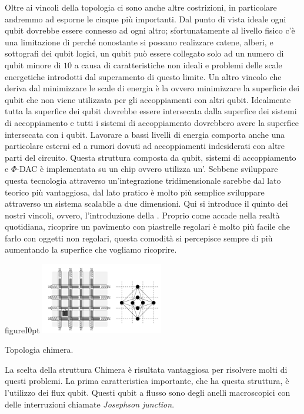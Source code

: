 Oltre ai vincoli della topologia ci sono anche altre costrizioni, in particolare andremmo ad esporne le cinque più importanti. Dal punto di vista ideale ogni qubit dovrebbe essere connesso ad ogni altro; sfortunatamente al livello fisico c'è una limitazione di  perché nonostante si possano realizzare catene, alberi, e sottografi dei qubit logici, un qubit può essere collegato solo ad un numero di qubit minore di $10$ a causa di caratteristiche non ideali e problemi delle scale energetiche introdotti dal superamento di questo limite. Un altro vincolo che deriva dal minimizzare le scale di energia è la  ovvero minimizzare la superficie dei qubit che non viene utilizzata per gli accoppiamenti con altri qubit. Idealmente tutta la superfice dei qubit dovrebbe essere intersecata dalla superfice dei sistemi di accoppiamento e tutti i sistemi di accoppiamento dovrebbero avere la superfice intersecata con i qubit. Lavorare a bassi livelli di energia comporta anche una particolare  esterni ed a rumori dovuti ad accoppiamenti indesiderati con altre parti del circuito. Questa struttura composta da qubit, sistemi di accoppiamento e $\Phi$-DAC è implementata su un chip ovvero utilizza un'. Sebbene sviluppare questa tecnologia attraverso un'integrazione tridimensionale sarebbe dal lato teorico più vantaggiosa, dal lato pratico è molto più semplice sviluppare attraverso un sistema scalabile a due dimensioni. Qui si introduce il quinto dei nostri vincoli, ovvero, l'introduzione della . Proprio come accade nella realtà quotidiana, ricoprire un pavimento con piastrelle regolari è molto più facile che farlo con oggetti non regolari, questa comodità si percepisce sempre di più aumentando la superfice che vogliamo ricoprire.

\begin{wrapfloat}{figure}{I}{0pt}
\includegraphics[width=0.4\textwidth]{Immagini/chimera.jpg}
\caption{Topologia chimera.}
\label{figura:chimera}
\end{wrapfloat}
\cite{ACI}La scelta della struttura Chimera è risultata vantaggiosa per risolvere molti di questi problemi. La prima caratteristica importante, che ha questa struttura, è l'utilizzo dei flux qubit. Questi qubit a flusso sono degli anelli macroscopici con delle interruzioni chiamate \textit{Josephson junction}.


